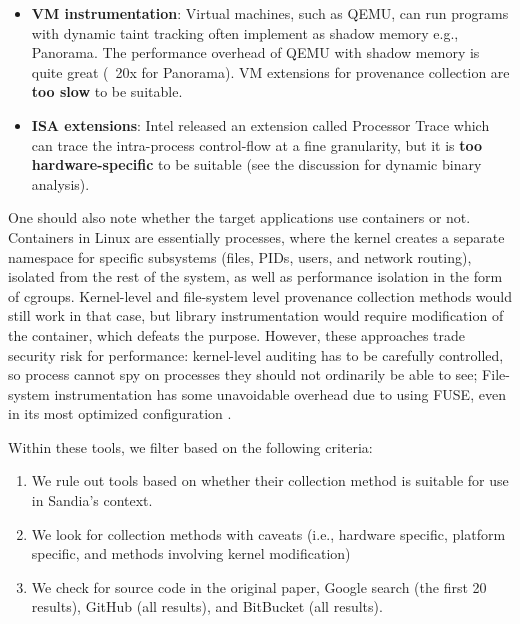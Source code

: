 \begin{itemize}
\item \textbf{VM instrumentation}:
Virtual machines, such as QEMU, can run programs with dynamic taint tracking often implement as shadow memory e.g., Panorama\cite{yin_panorama_2007}.
The performance overhead of QEMU with shadow memory is quite great (~20x for Panorama).
VM extensions for provenance collection are \textbf{too slow} to be suitable.

\item \textbf{ISA extensions}:
Intel released an extension called Processor Trace \cite{kleen_intel_2015} which can trace the intra-process control-flow at a fine granularity, but it is \textbf{too hardware-specific} to be suitable (see the discussion for dynamic binary analysis).

\end{itemize}

One should also note whether the target applications use containers or not.
Containers in Linux are essentially processes, where the kernel creates a separate namespace for specific subsystems (files, PIDs, users, and network routing), isolated from the rest of the system, as well as performance isolation in the form of cgroups.
Kernel-level and file-system level provenance collection methods would still work in that case, but library instrumentation would require modification of the container, which defeats the purpose.
However, these approaches trade security risk for performance: kernel-level auditing has to be carefully controlled, so process cannot spy on processes they should not ordinarily be able to see; File-system instrumentation has some unavoidable overhead due to using FUSE, even in its most optimized configuration \cite{vangoor_fuse_2017}.

Within these tools, we filter based on the following criteria:

\begin{enumerate}
\item
We rule out tools based on whether their collection method is suitable for use in Sandia's context.

\item
We look for collection methods with caveats (i.e., hardware specific, platform specific, and methods involving kernel modification)

\item
We check for source code in the original paper, Google search (the first 20 results), GitHub (all results), and BitBucket (all results).
\end{enumerate}

